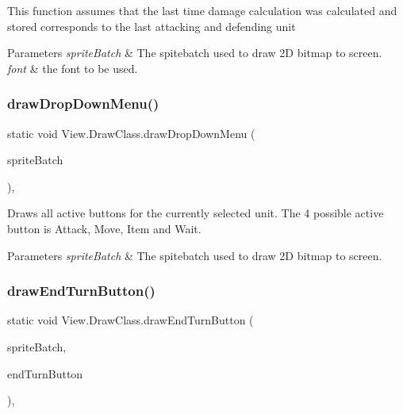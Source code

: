\begin{DoxyItemize}
\item This function assumes that the last time damage calculation was calculated and stored corresponds to the last attacking and defending unit 
\begin{DoxyParams}{Parameters}
{\em sprite\+Batch} & The spitebatch used to draw 2D bitmap to screen. \\
\hline
{\em font} & the font to be used. \\
\hline
\end{DoxyParams}

\end{DoxyItemize}\hypertarget{class_view_1_1_draw_class_ae75363224d26c1de36820c77c00bab4b}{}\label{class_view_1_1_draw_class_ae75363224d26c1de36820c77c00bab4b} 
\subsubsection{\texorpdfstring{draw\+Drop\+Down\+Menu()}{drawDropDownMenu()}}
{\footnotesize\ttfamily static void View.\+Draw\+Class.\+draw\+Drop\+Down\+Menu (\begin{DoxyParamCaption}\item[{Sprite\+Batch}]{sprite\+Batch }\end{DoxyParamCaption})\hspace{0.3cm}{\ttfamily [inline]}, {\ttfamily [static]}}

Draws all active buttons for the currently selected unit. The 4 possible active button is Attack, Move, Item and Wait. 
\begin{DoxyParams}{Parameters}
{\em sprite\+Batch} & The spitebatch used to draw 2D bitmap to screen. \\
\hline
\end{DoxyParams}
\hypertarget{class_view_1_1_draw_class_aadfde5664a486e1dc9581628ce98b0b6}{}\label{class_view_1_1_draw_class_aadfde5664a486e1dc9581628ce98b0b6} 
\subsubsection{\texorpdfstring{draw\+End\+Turn\+Button()}{drawEndTurnButton()}}
{\footnotesize\ttfamily static void View.\+Draw\+Class.\+draw\+End\+Turn\+Button (\begin{DoxyParamCaption}\item[{Sprite\+Batch}]{sprite\+Batch,  }\item[{Texture2D}]{end\+Turn\+Button }\end{DoxyParamCaption})\hspace{0.3cm}{\ttfamily [inline]}, {\ttfamily [static]}}

